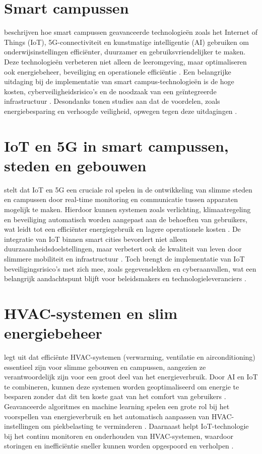 \section{Smart campussen}
\textcites{Min_Allah_2020,AbuAlnaaj2016,Ahmed2022} beschrijven hoe smart campussen geavanceerde technologieën zoals het Internet of Things (IoT), 5G-connectiviteit en kunstmatige intelligentie (AI) gebruiken om onderwijsinstellingen efficiënter, duurzamer en gebruiksvriendelijker te maken. Deze technologieën verbeteren niet alleen de leeromgeving, maar optimaliseren ook energiebeheer, beveiliging en operationele efficiëntie \autocite{Correia2022}. Een belangrijke uitdaging bij de implementatie van smart campus-technologieën is de hoge kosten, cyberveiligheidsrisico’s en de noodzaak van een geïntegreerde infrastructuur \autocite{Liu_2022}. Desondanks tonen studies aan dat de voordelen, zoals energiebesparing en verhoogde veiligheid, opwegen tegen deze uitdagingen \autocite{AbuAlnaaj2016}.

\section{IoT en 5G in smart campussen, steden en gebouwen}

\textcite{Bilardo_2021} stelt dat IoT en 5G een cruciale rol spelen in de ontwikkeling van slimme steden en campussen door real-time monitoring en communicatie tussen apparaten mogelijk te maken. Hierdoor kunnen systemen zoals verlichting, klimaatregeling en beveiliging automatisch worden aangepast aan de behoeften van gebruikers, wat leidt tot een efficiënter energiegebruik en lagere operationele kosten \autocite{Polin2023}. De integratie van IoT binnen smart cities bevordert niet alleen duurzaamheidsdoelstellingen, maar verbetert ook de kwaliteit van leven door slimmere mobiliteit en infrastructuur \autocite{Chew2020}. Toch brengt de implementatie van IoT beveiligingsrisico’s met zich mee, zoals gegevenslekken en cyberaanvallen, wat een belangrijk aandachtspunt blijft voor beleidsmakers en technologieleveranciers \autocite{Trivedi2017}.

\section{HVAC-systemen en slim energiebeheer}

\textcite{Correia2022} legt uit dat efficiënte HVAC-systemen (verwarming, ventilatie en airconditioning) essentieel zijn voor slimme gebouwen en campussen, aangezien ze verantwoordelijk zijn voor een groot deel van het energieverbruik. Door AI en IoT te combineren, kunnen deze systemen worden geoptimaliseerd om energie te besparen zonder dat dit ten koste gaat van het comfort van gebruikers \autocite{Min_Allah_2020}. Geavanceerde algoritmes en machine learning spelen een grote rol bij het voorspellen van energieverbruik en het automatisch aanpassen van HVAC-instellingen om piekbelasting te verminderen \autocite{Khoa2020}. Daarnaast helpt IoT-technologie bij het continu monitoren en onderhouden van HVAC-systemen, waardoor storingen en inefficiëntie sneller kunnen worden opgespoord en verholpen \autocite{Zhang2022}.


